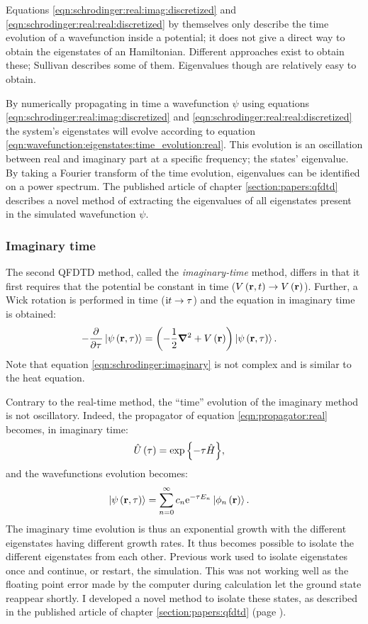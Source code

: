 Equations \eqref{eqn:schrodinger:real:imag:discretized} and
\eqref{eqn:schrodinger:real:real:discretized} by themselves only describe the
time evolution of a wavefunction inside a potential; it does not give a direct
way to obtain the eigenstates of an Hamiltonian. Different approaches exist to
obtain these; Sullivan describes some of them. Eigenvalues though are
relatively easy to obtain.

By numerically propagating in time a wavefunction $\psi$ using equations
\eqref{eqn:schrodinger:real:imag:discretized} and
\eqref{eqn:schrodinger:real:real:discretized} the system's eigenstates will
evolve according to equation
\eqref{eqn:wavefunction:eigenstates:time_evolution:real}. This evolution is an
oscillation between real and imaginary part at a specific frequency; the states'
eigenvalue. By taking a Fourier transform of the time evolution, eigenvalues
can be identified on a power spectrum. The published article of chapter
\ref{section:papers:qfdtd} describes a novel method of extracting the
eigenvalues of all eigenstates present in the simulated wavefunction $\psi$.



\subsubsection{Imaginary time}

The second QFDTD method, called the \textit{imaginary-time} method, differs in
that it first requires that the potential be constant in time
($V\left( \textbf{r}, t \right) \rightarrow V\left( \textbf{r} \right)$).
Further, a Wick rotation is performed in time ($\textrm{i} t \rightarrow \tau$)
and the \schrodinger equation in imaginary time is
obtained:
\begin{align}
- \frac{\partial^{{}} }{\partial {\tau}^{{}}} \left| \psi\left( \textbf{r}, \tau \right) \right>
    & = \left( -\frac{1}{2} \bm{\nabla}^2 + V\left( \textbf{r} \right)  \right) \left| \psi\left( \textbf{r}, \tau \right) \right>.
\label{eqn:schrodinger:imaginary}
\end{align}
Note that equation \eqref{eqn:schrodinger:imaginary} is not complex and is
similar to the heat equation.


Contrary to the real-time method, the ``time'' evolution of the imaginary
method is not oscillatory. Indeed, the propagator of equation
\eqref{eqn:propagator:real} becomes, in imaginary time:
\begin{align}
\hat{U}\left( \tau \right) & = \exp{ \left\{  - \tau  \hat{H} \right\}} \label{eqn:propagator:imag},
\end{align}
and the wavefunctions evolution becomes:
\begin{align}
\left| \psi\left( \textbf{r}, \tau \right) \right>
 & = \sum_{n=0}^{\infty} c_n \textrm{e}^{ - \tau E_n } \left| \phi_n\left( \textbf{r} \right) \right>.
\end{align}
The imaginary time evolution is thus an exponential growth with the different
eigenstates having different growth rates. It thus becomes possible to isolate
the different eigenstates from each other. Previous work used to isolate
eigenstates once and continue, or restart, the simulation. This was not working
well as the floating point error made by the computer during calculation let
the ground state reappear shortly. I developed a novel method to isolate these
states, as described in the published article of chapter
\ref{section:papers:qfdtd} (page \pageref{section:papers:qfdtd}).

